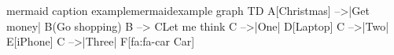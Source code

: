 \begin{mermaid}[8cm]{mermaid caption example}{mermaidexample}
graph TD
  A[Christmas] -->|Get money| B(Go shopping)
  B --> C{Let me think}
  C -->|One| D[Laptop]
  C -->|Two| E[iPhone]
  C -->|Three| F[fa:fa-car Car]
\end{mermaid}